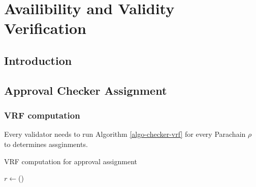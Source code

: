 
\chapter{Availibility and Validity Verification}

\section{Introduction}

\section{Approval Checker Assignment}
\subsection{VRF computation}

Every validator needs to run Algorithm \ref{algo-checker-vrf} for every Parachain $\rho$ to determines assginments.

\begin{algorithm}
\caption[VRF computation for approval assignment]{\sc VRF computation for approval assignment}
\label{algo-checker-vrf}
\begin{algorithmic}
\STATE $r\gets $()
\end{algorithmic}
\end{algorithm}



